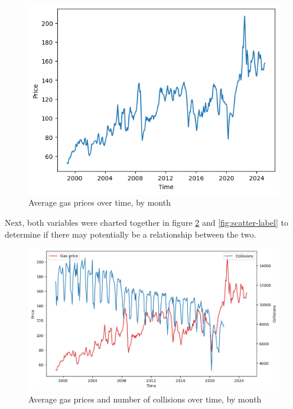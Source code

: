 \documentclass[runningheads]{llncs}
\begin{document}
\begin{figure}
    \centering
    \includegraphics[scale=0.75]{Gas_Chart.png}   
    \caption{Average gas prices over time, by month}
    \label{fig:gas-label}
\end{figure}

Next, both variables were charted together in figure \ref{fig:both-label} and \ref{fig:scatter-label} to determine if there may potentially be a relationship between the two.

\begin{figure}
    \centering
    \includegraphics[scale=0.45]{Both_Chart.png}   
    \caption{Average gas prices and number of collisions over time, by month}
    \label{fig:both-label}
\end{figure}
\end{document}
